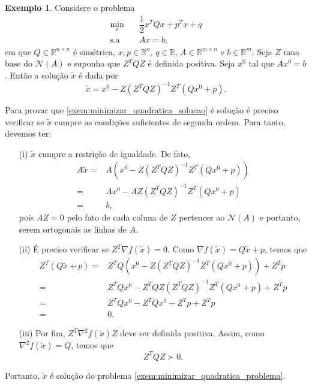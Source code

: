 \documentclass[12pt,a4paper]{scrartcl}
\def\RR{\mathds{R}}
\theoremstyle{definition}%
\newtheorem{exem}{Exemplo}
\begin{document}
\begin{exem}
Considere o problema
\[ \begin{aligned} \label{exem:minimizar_quadratica_problema}
\min_{x} & \quad \dfrac{1}{2}x^{T}Qx + p^{T}x + q \\
\text{s.a} & \quad Ax = b,
\end{aligned} \]
em que $Q \in \RR^{n\times n}$ é simétrica, $ x,p \in \RR^{n}$, $q \in \RR$, $A \in \RR^{m\times n}$ e $b \in \RR^{m}$. Seja $Z$ uma base do $\mathcal{N}(A)$ e suponha que $Z^{T}QZ$ é definida positiva. Seja $x^{0}$ tal que $Ax^{0}=b$. Então a solução $\tilde{x}$ é dada por
\[ \label{exem:minimizar_quadratica_solucao}
\tilde{x} = x^{0} - Z(Z^{T}QZ)^{-1} Z^{T}(Qx^{0} + p).
\]
\end{exem}
Para provar que \eqref{exem:minimizar_quadratica_solucao} é solução é preciso verificar se $\tilde{x}$ cumpre as condições suficientes de segunda ordem. Para tanto, devemos ter:
\begin{enumerate}
	\item[(i)] $\tilde{x}$ cumpre a restrição de igualdade. De fato,
	\[ \begin{aligned}
	A\tilde{x} = & A(x^{0} - Z(Z^{T}QZ)^{-1} Z^{T}(Qx^{0} + p)) \\
	= & Ax^{0} - AZ(Z^{T}QZ)^{-1} Z^{T}(Qx^{0} + p) \\
	= & b,
	\end{aligned} \]
	pois $AZ=0$ pelo fato de cada coluna de $Z$ pertencer ao $\mathcal{N}(A)$ e portanto, serem ortogonais as linhas de $A$.

	\item[(ii)] É preciso verificar se $Z^{T}\nabla f(\tilde{x}) = 0$. Como $\nabla f(\tilde{x}) = Q\tilde{x} + p$, temos que
	\[ \begin{aligned}
	Z^{T}(Q\tilde{x} +p) =& Z^{T} Q (x^{0} - Z(Z^{T}QZ)^{-1}Z^{T}(Qx^{0} +p)) + Z^{T}p \\
	=& Z^{T} Qx^{0} - Z^{T}QZ(Z^{T}QZ)^{-1}Z^{T}(Qx^{0} +p) + Z^{T}p \\
	=& Z^{T} Qx^{0} - Z^{T} Qx^{0} - Z^{T} p + Z^{T} p \\
	=& 0.
	\end{aligned} \]

	\item[(iii)] Por fim, $Z^{T}\nabla^{2} f(\tilde{x})Z$ deve ser definida positiva. Assim, como $\nabla^{2} f(\tilde{x}) = Q$, temos que 
	\[
	Z^{T}QZ \succ 0.
	\]
\end{enumerate}
Portanto, $\tilde{x}$ é solução do problema \eqref{exem:minimizar_quadratica_problema}.
\end{document}

